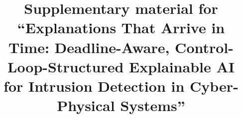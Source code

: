 \documentclass[preprint,12pt,authoryear]{elsarticle}
\begin{document}
\begin{frontmatter}
\title{Supplementary material for ``Explanations That Arrive in Time: Deadline-Aware, Control-Loop-Structured Explainable AI for Intrusion Detection in Cyber-Physical Systems''}
\end{frontmatter}





\end{document}
